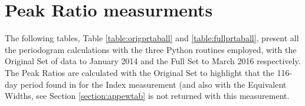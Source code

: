 \begin{table}[!htbp]
\centering
{}
\caption{This table shows the 5 highest peaks from the periodograms for the Original and Full Sets of Data.}
\protect\label{table:bothhaitable}
\end{table}

\section{{\ha} Peak Ratio measurments}
\protect\label{section:appprtab}

The following tables, Table \ref{table:origprtaball} and \ref{table:fullprtaball}, present all the periodogram
calculations with the three Python routines employed, with the Original Set of {\harps} data to January 2014 and the
Full Set to March 2016 respectively. The Peak Ratios are calculated with the Original Set to highlight that the 116-day
period found in \citet{suarezmascareno15} for the {\ha} Index measurement (and also with the Equivalent Widths, see
Section \ref{section:appewtab} is not returned with this measurement.

